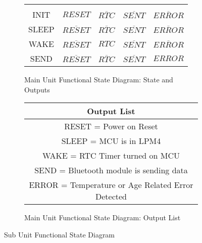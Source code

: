 \begin{center}
\begin{landscape}
\begin{figure}[!ht]
\begin{subfigure}[b]{0.5\textwidth}
\begin{tabular}{c|cccc}
        \hline
        &&&\\
        INIT&$RESET$&$\overline{RTC}$&$\overline{SENT}$&$\overline{ERROR}$\\
        SLEEP&$\overline{RESET}$&$\overline{RTC}$&$\overline{SENT}$&$\overline{ERROR}$\\
        WAKE&$\overline{RESET}$&$RTC$&$\overline{SENT}$&$\overline{ERROR}$\\
        SEND&$\overline{RESET}$&$\overline{RTC}$&$\overline{SENT}$&$ERROR$\\
      \end{tabular}
      \caption{Main Unit Functional State Diagram: State and Outputs}
      \label{fig:main-unit-fsd-state-outputs}
  \end{subfigure}
  \begin{subfigure}[b]{0.5\textwidth}
   \begin{tabular}{|c|}
    \hline
     Output List\\
    \hline
     RESET = Power on Reset\\
     SLEEP = MCU is in LPM4\\
     WAKE = RTC Timer turned on MCU\\
     SEND = Bluetooth module is sending data\\
     ERROR = Temperature or Age Related Error Detected\\
    \hline
   \end{tabular}
      \caption{Main Unit Functional State Diagram: Output List}
      \label{fig:main-unit-fsd-outputs-list}
  \end{subfigure}
\caption{Sub Unit Functional State Diagram}
\label{fig:sub-unit-fsd}
\end{figure}
\end{landscape}
\end{center}
